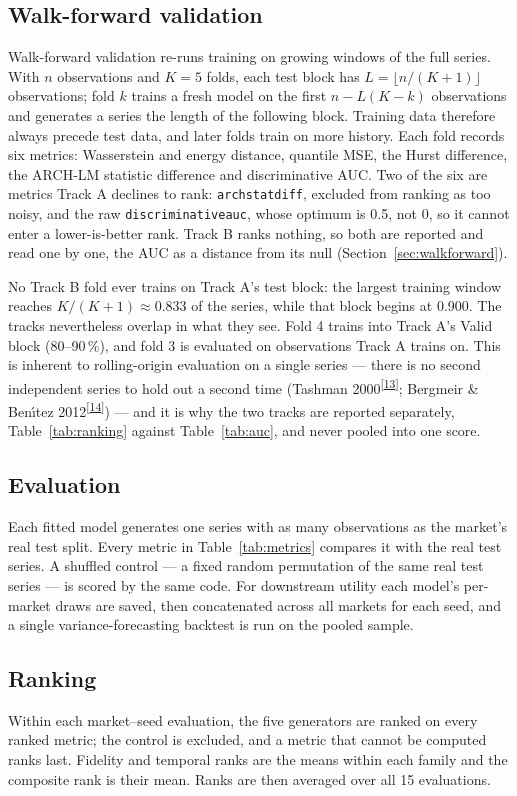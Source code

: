 \documentclass[11pt,a4paper]{article}
\makeatletter
\newcommand{\tcite}[1]{\textsuperscript{[\hyperlink{R:#1}{#1}]}}
\DeclareRobustCommand{\_}{\ifmmode\nfss@text{\textunderscore}\else\textunderscore\allowbreak\fi}
\makeatother
\begin{document}
\subsection{Walk-forward validation}
\label{sec:pipeline-wf}
Walk-forward validation re-runs training on growing windows of the full series. With $n$ observations and $K=5$ folds, each test block has $L=\lfloor n/(K+1)\rfloor$ observations; fold $k$ trains a fresh model on the first $n-L(K-k)$ observations and generates a series the length of the following block. Training data therefore always precede test data, and later folds train on more history. Each fold records six metrics: Wasserstein and energy distance, quantile MSE, the Hurst difference, the ARCH-LM statistic difference and discriminative AUC. Two of the six are metrics Track A declines to rank: \texttt{arch\_stat\_diff}, excluded from ranking as too noisy, and the raw \texttt{discriminative\_auc}, whose optimum is 0.5, not 0, so it cannot enter a lower-is-better rank. Track B ranks nothing, so both are reported and read one by one, the AUC as a distance from its null (Section~\ref{sec:walkforward}).

No Track B fold ever trains on Track A's test block: the largest training window reaches $K/(K+1)\approx 0.833$ of the series, while that block begins at 0.900. The tracks nevertheless overlap in what they see. Fold 4 trains into Track A's Valid block (80--90\,\%), and fold 3 is evaluated on observations Track A trains on. This is inherent to rolling-origin evaluation on a single series --- there is no second independent series to hold out a second time (Tashman 2000\tcite{13}; Bergmeir \& Ben\'{\i}tez 2012\tcite{14}) --- and it is why the two tracks are reported separately, Table~\ref{tab:ranking} against Table~\ref{tab:auc}, and never pooled into one score.

\subsection{Evaluation}
Each fitted model generates one series with as many observations as the market's real test split. Every metric in Table~\ref{tab:metrics} compares it with the real test series. A shuffled control --- a fixed random permutation of the same real test series --- is scored by the same code. For downstream utility each model's per-market draws are saved, then concatenated across all markets for each seed, and a single variance-forecasting backtest is run on the pooled sample.

\subsection{Ranking}
Within each market--seed evaluation, the five generators are ranked on every ranked metric; the control is excluded, and a metric that cannot be computed ranks last. Fidelity and temporal ranks are the means within each family and the composite rank is their mean. Ranks are then averaged over all 15 evaluations.
\end{document}

